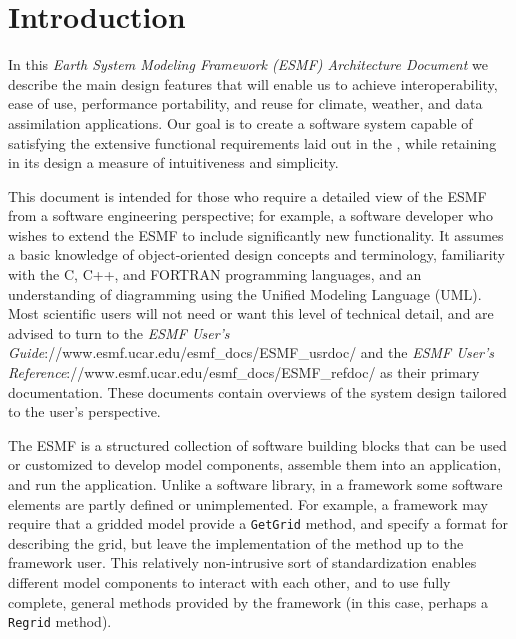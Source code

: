 \section{Introduction}
\label{sec:intro}

In this {\it Earth System Modeling Framework (ESMF) Architecture Document} we describe 
the main design features that will enable us to achieve interoperability, ease of 
use, performance portability, and reuse for climate, weather, and data assimilation
applications.  Our goal is to create a software system capable of satisfying
the extensive functional requirements laid out in the  
\cite{bib:ESMFreqdoc}, while retaining in its design a measure of intuitiveness 
and simplicity. 

This document is intended for those who require a detailed view of the ESMF
from a software engineering perspective; for example, a software developer who
wishes to extend the ESMF to include significantly new functionality.  It assumes 
a basic knowledge of object-oriented design concepts and terminology, familiarity 
with the C, C++, and FORTRAN programming languages, and an understanding of 
diagramming using the Unified Modeling Language (UML).  Most scientific users will 
not need or want this level of technical detail, and are advised to turn to 
the {\it ESMF User's Guide}{\http://www.esmf.ucar.edu/esmf\_docs/ESMF\_usrdoc/} 
and the {\it ESMF User's Reference}{\http://www.esmf.ucar.edu/esmf\_docs/ESMF\_refdoc/} 
as their primary documentation.  These documents contain overviews of the system 
design tailored to the user's perspective.

The ESMF is a structured collection of software building blocks 
that can be used or customized to develop model components, assemble them into an 
application, and run the application.  Unlike a software library, in a framework some
software elements are partly defined or unimplemented.  For example, a framework
may require that a gridded model provide a {\tt GetGrid} method, and specify 
a format for describing the grid, but leave the implementation of the method up
to the framework user.  This relatively non-intrusive sort of standardization enables 
different model components to interact with each other, and to use fully
complete, general methods provided by the framework (in this case, perhaps a 
{\tt Regrid} method).

